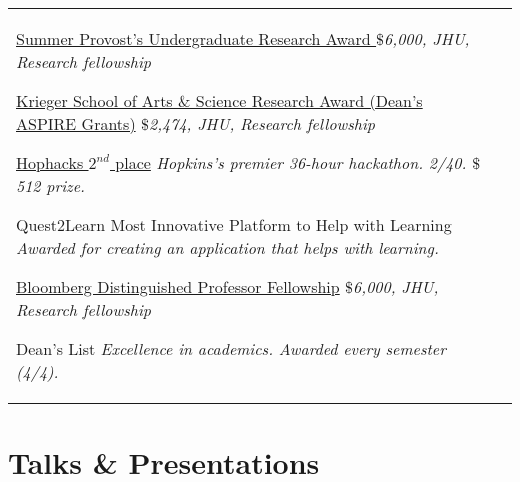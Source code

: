 \documentclass[10pt]{article} %
\begin{document}

	
\begin{supertabular}{L{4cm}@{\hskip 0.3in}L{13cm}}
{\href{https://hour.jhu.edu/opportunities/summerpura/}{Summer Provost’s Undergraduate Research Award }} %
{\textit{$\$$6,000, JHU, Research fellowship}} %

{\href{https://krieger.jhu.edu/ursca/projects/aspire-grant/}{Krieger School of Arts \& Science Research Award (Dean's ASPIRE Grants)}} %
{\textit{$\$$2,474, JHU, Research fellowship}} %

{\href{https://hophacks.com/}{Hophacks $2^{nd}$ place}} %
{\textit{Hopkins's premier 36-hour hackathon. 2/40. $\$$512 prize.}} %

{Quest2Learn Most Innovative Platform to Help with Learning }
{\textit{Awarded for creating an application that helps with learning.}}


{\href{https://hour.jhu.edu/opportunities/bdpsp/}{Bloomberg Distinguished Professor Fellowship}}
{\textit{$\$$6,000, JHU, Research fellowship}}

{Dean's List}
{\textit{Excellence in academics. Awarded every semester (4/4).}}
\end{supertabular}

	
	



\section{Talks \& Presentations}

\end{document}
